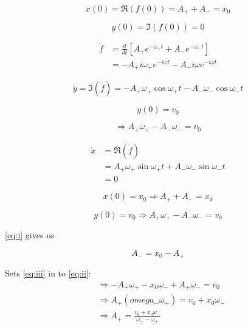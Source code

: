 \documentclass[english,notitlepage,reprint,nofootinbib]{revtex4-1}  %
\begin{document}
\begin{equation*}
    x(0) = \Re \left( f(0) \right) = A_+ + A_- = x_0
\end{equation*}

\begin{equation*}
    y(0) = \Im \left( f(0) \right) = 0
\end{equation*}

\begin{align*}
    \dot{f} &= \frac{d}{dt} \left[ A_+ e^{- \omega_+ t} + A_- e^{- \omega_- t}  \right] \\
    &= -A_+ i \omega_+ e^{-i \omega t} - A_- i \omega e^{-i \omega t}
\end{align*}

\begin{equation*}
    \dot{y} = \Im( \dot{f} ) = -A_+ \omega_+ \cos \omega_+ t - A_- \omega_- \cos \omega_- t
\end{equation*}

\begin{equation*}
    \dot{y}(0) = v_0
\end{equation*}

\begin{equation*}
    \Rightarrow A_+ \omega_+ - A_- \omega_- = v_0
\end{equation*}

\begin{align*}
    \dot{x} &= \Re ( \dot{f} )\\
    &= A_+ \omega_+ \sin \omega_+ t + A_- \omega_- \sin \omega_- t \\
    &= 0
\end{align*}

\begin{equation} \label{eq:i}
    x(0) = x_0 \Rightarrow A_+ + A_- = x_0
\end{equation}

\begin{equation} \label{eq:ii}
    y(0) = v_0 \Rightarrow A_+ \omega_+ - A_- \omega_- = v_0
\end{equation}

\ref{eq:i} gives us 

\begin{equation} \label{eq:iii}
    A_- = x_0 - A_+
\end{equation}

Sets \ref{eq:iii} in to \ref{eq:ii}:
\begin{align} \label{eq:iv}
    &\Rightarrow -A_+ \omega_+ - x_0 \omega_- + A_+ \omega_- = v_0 \nonumber \\
    &\Rightarrow A_+ ({omega_- \omega_+}) = v_0 + x_0 \omega_- \nonumber \\
    &\Rightarrow A_+ = \frac{v_0 + x_0 \omega_-}{\omega_- - \omega_+}
\end{align}
\end{document}

